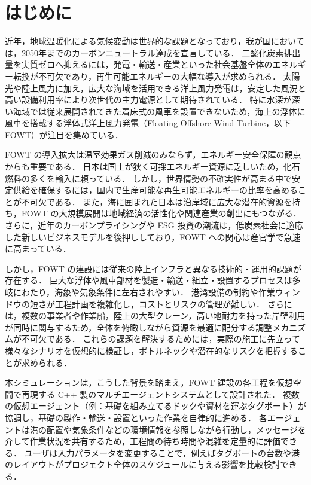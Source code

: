\documentclass[10pt,letterpaper]{jsarticle}
\begin{document}
\pagestyle{fancy}
\tableofcontents
\clearpage
\section{はじめに}

近年，地球温暖化による気候変動は世界的な課題となっており，我が国においては，2050年までのカーボンニュートラル達成を宣言している．
二酸化炭素排出量を実質ゼロへ抑えるには，発電・輸送・産業といった社会基盤全体のエネルギー転換が不可欠であり，再生可能エネルギーの大幅な導入が求められる．
太陽光や陸上風力に加え，広大な海域を活用できる洋上風力発電は，安定した風況と高い設備利用率により次世代の主力電源として期待されている．
特に水深が深い海域では従来展開されてきた着床式の風車を設置できないため，海上の浮体に風車を搭載する浮体式洋上風力発電（Floating Offshore Wind Turbine，以下FOWT）が注目を集めている．

FOWT の導入拡大は温室効果ガス削減のみならず，エネルギー安全保障の観点からも重要である．
日本は国土が狭く可採エネルギー資源に乏しいため，化石燃料の多くを輸入に頼っている．
しかし，世界情勢の不確実性が高まる中で安定供給を確保するには，国内で生産可能な再生可能エネルギーの比率を高めることが不可欠である．
また，海に囲まれた日本は沿岸域に広大な潜在的資源を持ち，FOWT の大規模展開は地域経済の活性化や関連産業の創出にもつながる．
さらに，近年のカーボンプライシングや ESG 投資の潮流は，低炭素社会に適応した新しいビジネスモデルを後押ししており，FOWT への関心は産官学で急速に高まっている．

しかし，FOWT の建設には従来の陸上インフラと異なる技術的・運用的課題が存在する．
巨大な浮体や風車部材を製造・輸送・組立・設置するプロセスは多岐にわたり，海象や気象条件に左右されやすい．
港湾設備の制約や作業ウィンドウの短さが工程計画を複雑化し，コストとリスクの管理が難しい．
さらには，複数の事業者や作業船，陸上の大型クレーン，高い地耐力を持った岸壁利用が同時に関与するため，全体を俯瞰しながら資源を最適に配分する調整メカニズムが不可欠である．
これらの課題を解決するためには，実際の施工に先立って様々なシナリオを仮想的に検証し，ボトルネックや潜在的なリスクを把握することが求められる．

本シミュレーションは，こうした背景を踏まえ，FOWT 建設の各工程を仮想空間で再現する C++ 製のマルチエージェントシステムとして設計された．
複数の仮想エージェント（例：基礎を組み立てるドックや資材を運ぶタグボート）が協調し，基礎の製作・輸送・設置といった作業を自律的に進める．
各エージェントは港の配置や気象条件などの環境情報を参照しながら行動し，メッセージを介して作業状況を共有するため，工程間の待ち時間や混雑を定量的に評価できる．
ユーザは入力パラメータを変更することで，例えばタグボートの台数や港のレイアウトがプロジェクト全体のスケジュールに与える影響を比較検討できる．
\end{document}

